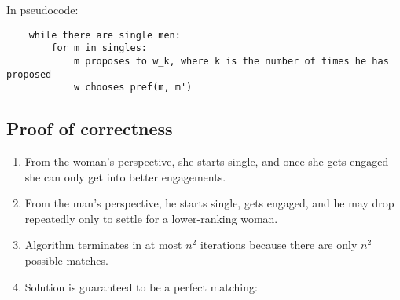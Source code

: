 \documentclass[11pt]{article}
\begin{document}
In pseudocode:
\begin{verbatim}
    while there are single men:
        for m in singles:
            m proposes to w_k, where k is the number of times he has proposed
            w chooses pref(m, m')
\end{verbatim}
\subsection{Proof of correctness}
\begin{enumerate}
    \item From the woman's perspective, she starts single, and once she gets engaged she can only get into better engagements.
    \item From the man's perspective, he starts single, gets engaged, and he may drop repeatedly only to settle for a lower-ranking woman.
    \item Algorithm terminates in at most $n^2$ iterations because there are only $n^2$ possible matches.
    \item Solution is guaranteed to be a perfect matching:
\end{enumerate}

{}
\end{document}

